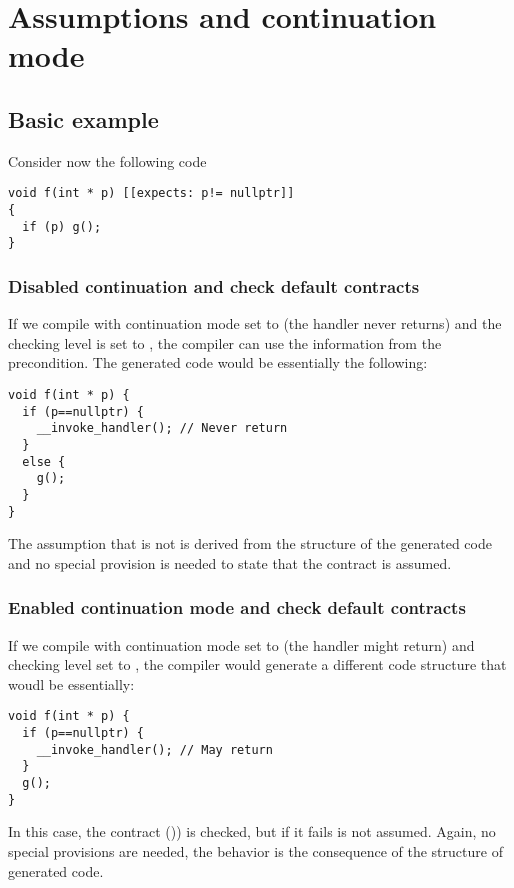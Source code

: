 \section{Assumptions and continuation mode}

\subsection{Basic example}

Consider now the following code

\begin{lstlisting}
void f(int * p) [[expects: p!= nullptr]]
{
  if (p) g();
}
\end{lstlisting}

\subsubsection{Disabled continuation and check default contracts}

If we compile with continuation mode set to  (the handler never returns)
and the checking level is set to , the compiler can
use the information from the precondition. The generated code would be
essentially the following:

\begin{lstlisting}
void f(int * p) {
  if (p==nullptr) {
    __invoke_handler(); // Never return
  }
  else {
    g();
  }
}
\end{lstlisting}

The assumption that  is not  is derived from the
structure of the generated code and no special provision is needed to state
that the contract is assumed.

\subsubsection{Enabled continuation mode and check default contracts}

If we compile with continuation mode set to  (the handler might return)
and checking level set to , the compiler would generate a different
code structure that woudl be essentially:

\begin{lstlisting}
void f(int * p) {
  if (p==nullptr) {
    __invoke_handler(); // May return
  }
  g();
}
\end{lstlisting}

In this case, the contract ()) is checked, but if it
fails is not assumed. Again, no special provisions are needed, the behavior is the
consequence of the structure of generated code. 

